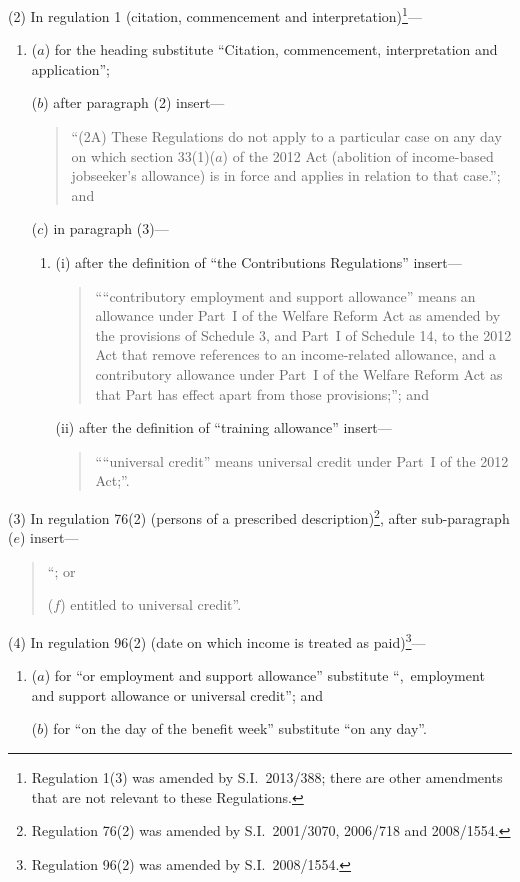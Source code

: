 \documentclass[12pt,a4paper]{article}
\begin{document}
(2) In regulation 1 (citation, commencement and interpretation)\footnote{Regulation 1(3) was amended by S.I.~2013/388; there are other amendments that are not relevant to these Regulations.}—
\begin{enumerate}\item[]
($a$) for the heading substitute “Citation, commencement, interpretation and application”;

($b$) after paragraph (2) insert—
\begin{quotation}
“(2A) These Regulations do not apply to a particular case on any day on which section 33(1)($a$)  of the 2012 Act (abolition of income-based jobseeker’s allowance) is in force and applies in relation to that case.”; and
\end{quotation}

($c$) in paragraph (3)—
\begin{enumerate}\item[]
(i) after the definition of “the Contributions Regulations” insert—
\begin{quotation}
““contributory employment and support allowance” means an allowance under Part~I of the Welfare Reform Act as amended by the provisions of Schedule 3, and Part~I of Schedule 14, to the 2012 Act that remove references to an income-related allowance, and a contributory allowance under Part~I of the Welfare Reform Act as that Part has effect apart from those provisions;”; and
\end{quotation}

(ii) after the definition of “training allowance” insert—
\begin{quotation}
““universal credit” means universal credit under Part~I of the 2012 Act;”.
\end{quotation}
\end{enumerate}
\end{enumerate}

(3) In regulation 76(2) (persons of a prescribed description)\footnote{Regulation 76(2) was amended by S.I.~2001/3070, 2006/718 and 2008/1554.}, after sub-paragraph ($e$)  insert—
\begin{quotation}
“; or

($f$) entitled to universal credit”.
\end{quotation}

(4) In regulation 96(2) (date on which income is treated as paid)\footnote{Regulation 96(2) was amended by S.I.~2008/1554.}—
\begin{enumerate}\item[]
($a$) for “or employment and support allowance” substitute “,~employment and support allowance or universal credit”; and

($b$) for “on the day of the benefit week” substitute “on any day”.
\end{enumerate}
\end{document}
